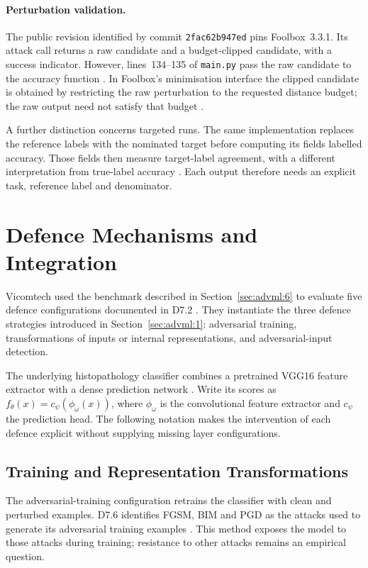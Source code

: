 \paragraph{Perturbation validation.} The public revision identified by commit
\texttt{2fac62b947ed} pins Foolbox~3.3.1. Its attack call returns a raw candidate and a
budget-clipped candidate, with a success indicator. However, lines~134--135 of
\texttt{main.py} pass the raw candidate to the accuracy function
\cite{norouzian2021adversarialbenchmark}. In Foolbox's minimisation interface the clipped
candidate is obtained by restricting the raw perturbation to the requested distance budget;
the raw output need not satisfy that budget \cite{foolbox2021api}.

A further distinction concerns targeted runs. The same implementation replaces the reference
labels with the nominated target before computing its fields labelled accuracy. Those fields
then measure target-label agreement, with a different interpretation from true-label accuracy
\cite{norouzian2021adversarialbenchmark}. Each output therefore needs an explicit task,
reference label and denominator.

\section{Defence Mechanisms and Integration}
\label{sec:advml:7}

Vicomtech used the benchmark described in Section~\ref{sec:advml:6} to evaluate five defence
configurations documented in D7.2 \cite{sparta2020d72,sparta2022d76}. They instantiate the
three defence strategies introduced in Section~\ref{sec:advml:1}: adversarial training,
transformations of inputs or internal representations, and adversarial-input detection.

The underlying histopathology classifier combines a pretrained VGG16 feature extractor with
a dense prediction network \cite{sparta2020d72,sparta2022d76}. Write its scores as
$f_\theta(x)=c_\psi(\phi_\omega(x))$, where $\phi_\omega$ is the convolutional feature
extractor and $c_\psi$ the prediction head. The following notation makes the intervention
of each defence explicit without supplying missing layer configurations.

\subsection{Training and Representation Transformations}

The adversarial-training configuration retrains the classifier with clean and perturbed
examples. D7.6 identifies FGSM, BIM and PGD as the attacks used to generate its adversarial
training examples \cite{sparta2022d76}. This method exposes the model to those attacks during
training; resistance to other attacks remains an empirical question.

